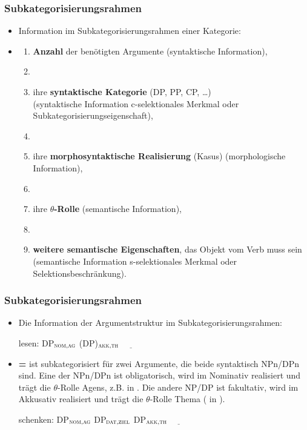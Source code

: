 \begin{frame}
\frametitle{Subkategorisierungsrahmen}

\begin{itemize}
	\item Information im Subkategorisierungsrahmen einer Kategorie:
	\item[]
	\begin{enumerate}
		\item \textbf{Anzahl} der benötigten Argumente (syntaktische Information),
		\item[]
		\item ihre \textbf{syntaktische Kategorie} (DP, PP, CP, \dots )\\
		(syntaktische Information \ras c-selektionales Merkmal oder Subkategorisierungseigenschaft),
		\item[]
		\item ihre \textbf{morphosyntaktische Realisierung} (\zB Kasus) (morphologische Information),
		\item[]
		\item ihre \textbf{$\theta$-Rolle} (semantische Information),
		\item[]
		\item \textbf{weitere semantische Eigenschaften}, \zB das Objekt vom Verb  muss  sein (semantische Information \ras s-selektionales Merkmal oder 	Selektionsbeschränkung).
	\end{enumerate}
	
\end{itemize}

\end{frame}


\begin{frame}
\frametitle{Subkategorisierungsrahmen}

\begin{itemize}

	\item Die Information der Argumentstruktur im Subkategorisierungsrahmen:
	
	\ea lesen: DP$_{\textsc{nom,ag}}$ (DP)$_{\textsc{akk,th}}$ $\underline{\qquad}$
	\z
	
	\item[] \textbf{=}  ist subkategorisiert für zwei Argumente, die beide syntaktisch NPn/DPn sind. Eine der NPn/DPn ist obligatorisch, wird im Nominativ realisiert und trägt die $\theta$-Rolle Agens, z.B.  in . Die andere NP/DP ist fakultativ, wird im Akkusativ realisiert und trägt die $\theta$-Rolle Thema (\zB {} in ).

	\ea schenken: DP$_{\textsc{nom,ag}}$ DP$_{\textsc{dat,ziel}}$  DP$_{\textsc{akk,th}}$ $\underline{\qquad}$ 
	\z
		
\end{itemize}

\end{frame}


